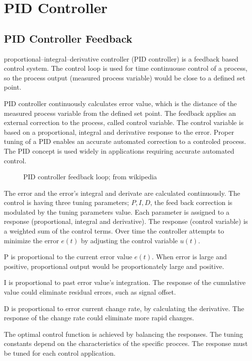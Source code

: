 \documentclass[\main/master.tex]{subfiles}
\begin{document}
\section{PID Controller}
\subsection{PID Controller Feedback}
proportional–integral–derivative controller (PID controller) is a feedback based control system. The control loop is used for time continuouse control of a process, so the process output (measured process variable) would be close to a defined set point.
\par
PID controller continuously calculates error value, which is the distance of the measured process variable from the defined set point. The feedback applies an external correction to the process, called control variable. The control variable is based on a proportional, integral and derivative response to the error. Proper tuning of a PID enables an accurate automated correction to a controled process. The PID concept is used widely in applications requiring accurate automated control.
\par
\begin{figure}[htbp]
	\centering
	\caption[PID]{PID controller feedback loop; from wikipedia}
	\label{fig:PID_scheme}
\end{figure}



\par
The error and the error's integral and derivate are calculated continuously. The control is having three tuning parameters; $P, I, D$, the feed back correction is modulated by the tuning parameters value. Each parameter is assigned to a response (proportional, integral and derivative). The response (control variable) is a weighted sum of the control terms. Over time the controller attempts to minimize the error $e(t)$ by adjusting the control variable $u(t)$.
\par
P is proportional to the current error value $e(t)$. When error is large and positive, proportional output would be proportionately large and positive.
\par
I is proportional to past error value's integration. The response of the cumulative value could eliminate residual errors, such as signal offset.
\par
D is proportional to error current change rate, by calculating the derivative. The response of the change rate could eliminate more rapid changes.
\par
The optimal control function is achieved by balancing the responses. The tuning constants depend on the characteristics of the specific procces. The response must be tuned for each control application.  
\end{document}
